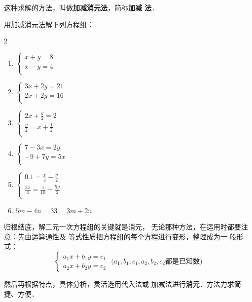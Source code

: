 这种求解的方法，叫做\textbf{加减消元法}，简称\textbf{加减
法}．

\begin{ex}
    用加减消元法解下列方程组：
\begin{multicols}{2}
\begin{enumerate}
    \item $\begin{cases}
        x  +  y  = 8  \\ x  -  y  = 4  \\
    \end{cases}$
    \item $\begin{cases}
       3 x  +  2y  =21   \\ 2x  + 2 y  = 16  \\
    \end{cases}$
    \item $\begin{cases}
       2 x  +  \frac{y}{2}  = 2  \\ \frac{y}{2} =x +\frac{1}{2}       \\
    \end{cases}$
    \item $\begin{cases}
      7- 3 x =2  y    \\ -9+ 7 y  =5x   \\
    \end{cases}$
    \item $\begin{cases}
       0.1=\frac{x}{4} -\frac{y}{2}   \\ \frac{3x}{4}=\frac{1}{10}+\frac{5y}{2}   \\
    \end{cases}$
    \item $5m-4n=33=3m+2n$
\end{enumerate}
\end{multicols}
\end{ex}

归根结底，解二元一次方程组的关键就是消元，
无论那种方法，在运用时都要注意：先由运算通性及
等式性质把方程组的每个方程进行变形，整理成为一
般形式：
\[\begin{cases}
    a_1x+b_1y=c_1\\
    a_2x+b_2y=c_2
\end{cases} \text{ ($a_1,b_1,c_1,a_2,b_2,c_2$都是已知数)}\]

    然后再根据特点，具体分析，灵活选用代入法或
加减法进行\textbf{消元}．方法力求简捷、方便．

